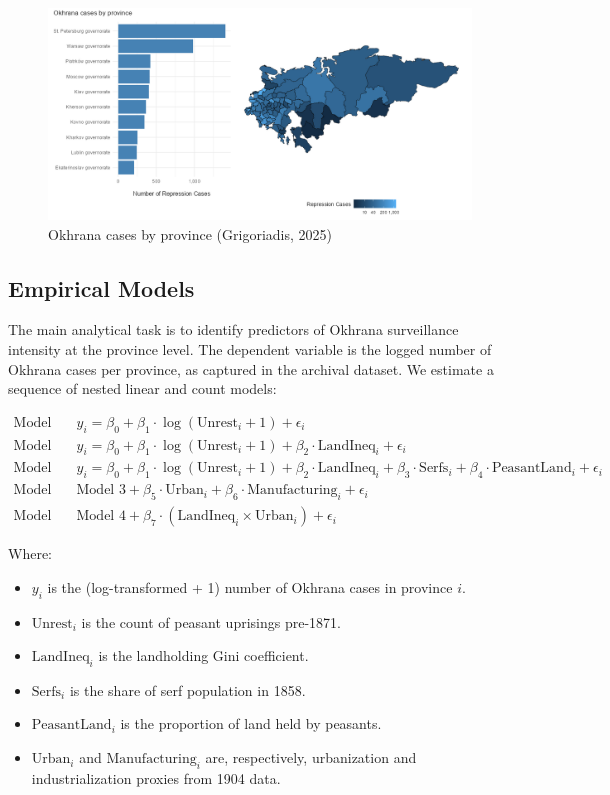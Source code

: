 \documentclass[11pt]{scrarticle}
\begin{document}
\begin{figure}
  \centering
  \caption{Okhrana cases by province (Grigoriadis, 2025)}
  \includegraphics[width = \textwidth]{okhrana_by_province.png}
\end{figure}

\subsection{Empirical Models}

The main analytical task is to identify predictors of Okhrana surveillance intensity at the province level. The dependent variable is the logged number of Okhrana cases per province, as captured in the archival dataset. We estimate a sequence of nested linear and count models:

\begin{align*}
    \text{Model 1:} \quad & y_i = \beta_0 + \beta_1 \cdot \log(\text{Unrest}_i + 1) + \epsilon_i \\
    \text{Model 2:} \quad & y_i = \beta_0 + \beta_1 \cdot \log(\text{Unrest}_i + 1) + \beta_2 \cdot \text{LandIneq}_i + \epsilon_i \\
    \text{Model 3:} \quad & y_i = \beta_0 + \beta_1 \cdot \log(\text{Unrest}_i + 1) + \beta_2 \cdot \text{LandIneq}_i + \beta_3 \cdot \text{Serfs}_i + \beta_4 \cdot \text{PeasantLand}_i + \epsilon_i \\
    \text{Model 4:} \quad & \text{Model 3} + \beta_5 \cdot \text{Urban}_i + \beta_6 \cdot \text{Manufacturing}_i + \epsilon_i \\
    \text{Model 5:} \quad & \text{Model 4} + \beta_7 \cdot (\text{LandIneq}_i \times \text{Urban}_i) + \epsilon_i
\end{align*}

Where:
\begin{itemize}
    \item $y_i$ is the (log-transformed + 1) number of Okhrana cases in province $i$.
    \item $\text{Unrest}_i$ is the count of peasant uprisings pre-1871.
    \item $\text{LandIneq}_i$ is the landholding Gini coefficient.
    \item $\text{Serfs}_i$ is the share of serf population in 1858.
    \item $\text{PeasantLand}_i$ is the proportion of land held by peasants.
    \item $\text{Urban}_i$ and $\text{Manufacturing}_i$ are, respectively, urbanization and industrialization proxies from 1904 data.
\end{itemize}
\end{document}
